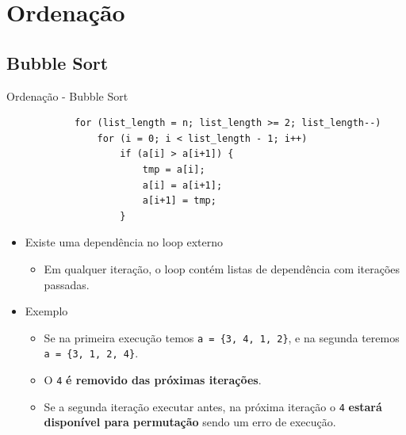 \section{Ordenação}
	\subsection{Bubble Sort}
	\begin{frame}[fragile]{Ordenação - Bubble Sort}
		\begin{verbatim}
			for (list_length = n; list_length >= 2; list_length--) 
				for (i = 0; i < list_length - 1; i++)
					if (a[i] > a[i+1]) { 
						tmp = a[i];
						a[i] = a[i+1];
						a[i+1] = tmp;
					}
		\end{verbatim}
					\pause
		\begin{itemize}
			\item Existe uma dependência no loop externo
			\begin{itemize}
				\item Em qualquer iteração, o loop contém listas de dependência com iterações passadas.
			\end{itemize}
			\item Exemplo
			\begin{itemize}
				\item Se na primeira execução temos {\tt a = \{3, 4, 1, 2\}}, e na segunda teremos {\tt a = \{3, 1, 2, 4\}}.
						\pause
				\item O \texttt{4} \textbf{é removido das próximas iterações}.
						\bigskip
						\pause
				\item Se a segunda iteração executar antes, na próxima iteração o \texttt{4} \textbf{estará disponível para permutação} sendo um erro de execução.
			\end{itemize}
		\end{itemize}
\end{frame}


